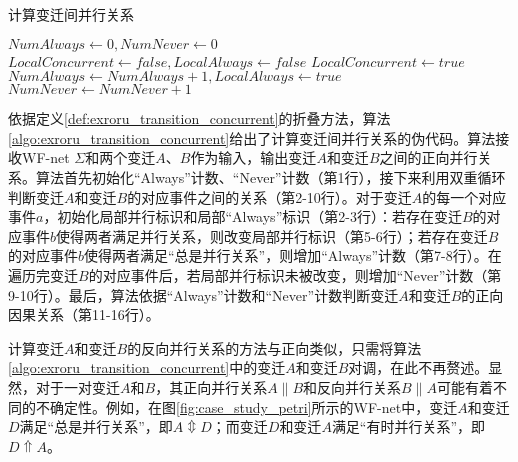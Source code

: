 \begin{algorithm}[htbp]
  \LinesNumbered
  \caption{计算变迁间并行关系}
  \label{algo:exroru_transition_concurrent}
  $NumAlways\leftarrow 0,NumNever\leftarrow 0$\;
   {
    $LocalConcurrent\leftarrow false,LocalAlways\leftarrow false$\;
     {
       {
        $LocalConcurrent\leftarrow true$\;
      }
       {
        $NumAlways\leftarrow NumAlways+1,LocalAlways\leftarrow true$\;
      }
    }
     {
      $NumNever\leftarrow NumNever+1$\;
    }
  }
   {
  }  {
  } 
\end{algorithm}

依据定义\ref{def:exroru_transition_concurrent}的折叠方法，算法\ref{algo:exroru_transition_concurrent}给出了计算变迁间并行关系的伪代码。算法接收WF-net $\Sigma$和两个变迁$A$、$B$作为输入，输出变迁$A$和变迁$B$之间的正向并行关系。算法首先初始化“Always”计数、“Never”计数（第1行），接下来利用双重循环判断变迁$A$和变迁$B$的对应事件之间的关系（第2-10行）。对于变迁$A$的每一个对应事件$a$，初始化局部并行标识和局部“Always”标识（第2-3行）：若存在变迁$B$的对应事件$b$使得两者满足并行关系，则改变局部并行标识（第5-6行）；若存在变迁$B$的对应事件$b$使得两者满足“总是并行关系”，则增加“Always”计数（第7-8行）。在遍历完变迁$B$的对应事件后，若局部并行标识未被改变，则增加“Never”计数（第9-10行）。最后，算法依据“Always”计数和“Never”计数判断变迁$A$和变迁$B$的正向因果关系（第11-16行）。

计算变迁$A$和变迁$B$的反向并行关系的方法与正向类似，只需将算法\ref{algo:exroru_transition_concurrent}中的变迁$A$和变迁$B$对调，在此不再赘述。显然，对于一对变迁$A$和$B$，其正向并行关系$A\parallel B$和反向并行关系$B\parallel A$可能有着不同的不确定性。例如，在图\ref{fig:case_study_petri}所示的WF-net中，变迁$A$和变迁$D$满足“总是并行关系”，即$A\Updownarrow D$；而变迁$D$和变迁$A$满足“有时并行关系”，即$D\Uparrow A$。


